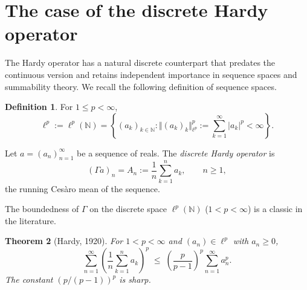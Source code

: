 \documentclass[12pt,a4paper]{amsart}
\newtheorem{theorem}{Theorem}[section]
\theoremstyle{definition}
\newtheorem{definition}[theorem]{Definition}
\begin{document}
\section{The case of the discrete Hardy operator}

The Hardy operator has a natural discrete counterpart that predates
the continuous version and retains independent importance in sequence
spaces and summability theory. We recall the following definition of sequence spaces.
\begin{definition}\label{def:sequencespace}
For $1\leq p<\infty$, 
    $$\ell^p:=\ell^{p}(\mathbb{N})=\left\{(a_{k})_{k\in\mathbb{N}} : \Vert (a_{k})_k\Vert_{\ell^p}^p:=\sum_{k=1}^{\infty}|a_{k}|^p<\infty\right\}.$$
\end{definition}


Let $a=(a_n)_{n=1}^\infty$ be a sequence of reals.
The \emph{discrete Hardy operator} is
\begin{equation}\label{eq:disH}
  (\Gamma a)_n =A_n:= \frac{1}{n}\sum_{k=1}^n a_k, \qquad n\ge 1,
\end{equation}
the running Ces\`aro mean of the sequence.

The boundedness of $\Gamma$ on the discrete space $\ell^p(\mathbb{N})$ ($1<p<\infty$) is a classic in the literature.
\begin{theorem}[Hardy, 1920]\label{thm:disHardy}
For $1<p<\infty$ and $(a_n)\in\ell^p$ with $a_n\ge 0$,
\begin{equation}\label{eq:discineq}
  \sum_{n=1}^\infty \left(\frac{1}{n}\sum_{k=1}^n a_k\right)^p
  \;\le\;
  \left(\frac{p}{p-1}\right)^p \sum_{n=1}^\infty a_n^p.
\end{equation}
The constant $(p/(p-1))^p$ is sharp.
\end{theorem}
\end{document}
